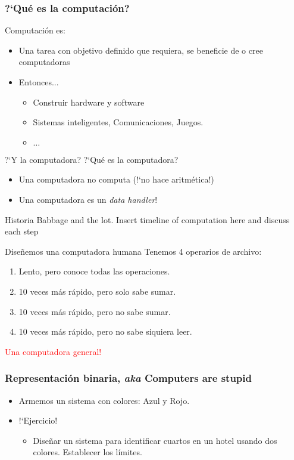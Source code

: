 
\begin{frame}
    \frametitle{?`Qu\'e es la computaci\'on?}
    Computaci\'on es:
    \begin{itemize}
        \item Una tarea con objetivo definido que requiera, se beneficie de o cree computadoras \cite{ACM1}
        \item Entonces... \pause
            \begin{itemize}
                \item Construir hardware y software \pause
                \item Sistemas inteligentes, Comunicaciones, Juegos.  
                \item $\ldots$
            \end{itemize}
    \end{itemize}
    \pause
    ?`Y la computadora? ?`Qu\'e es la computadora?
    \begin{itemize}
        \item Una computadora no computa (!`no hace aritm\'etica!) \pause
        \item Una computadora es un \emph{data handler}!
    \end{itemize}
\end{frame}

\begin{frame}{Historia}
    Babbage and the lot.
    Insert timeline of computation here and discuss each step
\end{frame}

\begin{frame}{Dise\~nemos una computadora humana}
    Tenemos 4 operarios de archivo: \pause
    \begin{enumerate}
        \item Lento, pero conoce todas las operaciones. \pause
        \item 10 veces m\'as r\'apido, pero solo sabe sumar. \pause
        \item 10 veces m\'as r\'apido, pero no sabe sumar. \pause
        \item 10 veces m\'as r\'apido, pero no sabe siquiera leer.\pause
    \end{enumerate}
    \textcolor{red}{Una computadora general!} 
\end{frame}

\begin{frame}
    \frametitle{Representaci\'on binaria, \emph{aka} Computers are stupid}
    \begin{itemize}
       \item Armemos un sistema con colores: Azul y Rojo.
       \item !`Ejercicio! 
           \begin{itemize}
               \item Dise\~nar un sistema para identificar cuartos en un hotel usando dos colores. Establecer los l\'imites.
           \end{itemize}
    \end{itemize}
\end{frame}

